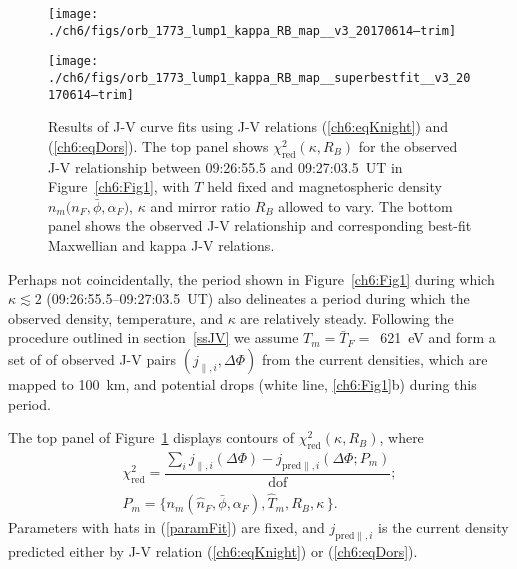 
  \begin{figure}
    \centering

    \noindent\texttt{[image: ./ch6/figs/orb\_1773\_lump1\_kappa\_RB\_map\_\_v3\_20170614--trim]}

    \vspace{1cm}

    \noindent\texttt{[image: ./ch6/figs/orb\_1773\_lump1\_kappa\_RB\_map\_\_superbestfit\_\_v3\_20170614--trim]}

    \caption[Orbit 1773: Reduced chi-squared values for observed J-V curves with
    $T$ held fixed and magnetospheric density $n_m \big ( n_F, \bar{\phi},
    \alpha_F \big )$ $\kappa$ and $R_B$ allowed to vary, and corresponding
    best-fit J-V curves.]{Results of J-V curve fits using J-V relations
      (\ref{ch6:eqKnight}) and (\ref{ch6:eqDors}). The top panel shows
      $\chi^2_{\mathrm{red}} ( \kappa, R_B)$ for the
      observed J-V relationship between 09:26:55.5 and 09:27:03.5~UT in
      Figure~\ref{ch6:Fig1}, with $T$ held fixed and magnetospheric density $n_m
      \big ( n_F, \bar{\phi}, \alpha_F \big )$, $\kappa$ and mirror ratio $R_B$
      allowed to vary. The bottom panel shows the observed J-V relationship and
      corresponding best-fit Maxwellian and kappa J-V relations.}
    \label{ch6:Fig3}
  \end{figure}


  Perhaps not coincidentally, the period shown in Figure~\ref{ch6:Fig1} during
  which $\kappa \lesssim 2$ (09:26:55.5--09:27:03.5~UT) also delineates a period
  during which the observed density, temperature, and $\kappa$ are relatively
  steady. Following the procedure outlined in section~\ref{ssJV} we assume
  $T_m = \bar{T}_F =$~621~eV and form a set of of observed J-V pairs
  $( j_{\parallel,i} , \Delta \Phi )$ from the current densities, which are
  mapped to 100~km, and potential drops (white line, \ref{ch6:Fig1}b) during
  this period.

  The top panel of Figure~\ref{ch6:Fig3} displays contours of
  $\chi^2_{\textrm{red}} ( \kappa, R_B )$, where
  \begin{subequations}
    \begin{align} \chi^2_{\mathrm{red}} = \dfrac{\sum_i j_{\parallel,i} (\Delta \Phi) - j_{\textrm{pred}\parallel,i}(\Delta \Phi; P_m)}{\mathrm{dof}}; \\
      P_m = \Big \{ n_m ( \hat{n}_F, \bar{\phi} , \alpha_F ), \hat{T}_m, R_B,
      \kappa \, \Big \}. \label{paramFit}
    \end{align}
  \end{subequations}
  Parameters with hats in (\ref{paramFit}) are fixed, and
  $j_{\textrm{pred}\parallel,i} $ is the current density predicted either by J-V
  relation (\ref{ch6:eqKnight}) or (\ref{ch6:eqDors}).

